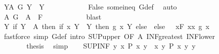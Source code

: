 \begin{isabellebody}
\ {\isachardoublequoteopen}{\isasymforall}Y{\isasymin}A{\isachardot}{\kern0pt}\ G\ Y\ {\isasymin}\ Y{\isachardoublequoteclose}\isanewline
\ \ \ \ \ \ \ \ \ \ \isamarkupfalse%
\ False\ some{\isacharunderscore}{\kern0pt}in{\isacharunderscore}{\kern0pt}eq\ G{\isacharunderscore}{\kern0pt}def\ \isamarkupfalse%
\ auto\isanewline
\ \ \ \ \ \ \ \ \isamarkupfalse%
\ \isamarkupfalse%
\ A{\isacharcolon}{\kern0pt}\ {\isachardoublequoteopen}G\ {\isacharbackquote}{\kern0pt}\ A\ {\isasymin}\ {\isacharquery}{\kern0pt}F{\isachardoublequoteclose}\isanewline
\ \ \ \ \ \ \ \ \ \ \isamarkupfalse%
\ blast\isanewline
\ \ \ \ \ \ \ \ \isamarkupfalse%
\ {\isachardoublequoteopen}{\isacharparenleft}{\kern0pt}{\isasymSqinter}Y{\isachardot}{\kern0pt}\ if\ Y\ {\isasymin}\ A\ then\ if\ x\ Y\ {\isasymin}\ Y\ then\ g\ {\isacharparenleft}{\kern0pt}x\ Y{\isacharparenright}{\kern0pt}\ else\ {\isasymbottom}\ else\ {\isasymtop}{\isacharparenright}{\kern0pt}\ {\isasymle}\ {\isacharparenleft}{\kern0pt}{\isasymSqunion}x{\isasymin}{\isacharquery}{\kern0pt}F{\isachardot}{\kern0pt}\ {\isasymSqinter}x{\isasymin}x{\isachardot}{\kern0pt}\ g\ x{\isacharparenright}{\kern0pt}{\isachardoublequoteclose}\isanewline
\ \ \ \ \ \ \ \ \ \ \isamarkupfalse%
\ {\isacharparenleft}{\kern0pt}fastforce\ simp{\isacharcolon}{\kern0pt}\ G{\isacharunderscore}{\kern0pt}def\ intro{\isacharcolon}{\kern0pt}\ SUP{\isacharunderscore}{\kern0pt}upper{}\ {\isacharbrackleft}{\kern0pt}OF\ A{\isacharbrackright}{\kern0pt}\ INF{\isacharunderscore}{\kern0pt}greatest\ INF{\isacharunderscore}{\kern0pt}lower{}{\isacharparenright}{\kern0pt}\isanewline
\ \ \ \ \ \ \isamarkupfalse%
\isanewline
\ \ \ \ \isamarkupfalse%
\isanewline
\ \ \ \ \isamarkupfalse%
\ \isamarkupfalse%
\ {\isacharquery}{\kern0pt}thesis\ \isamarkupfalse%
\ simp\isanewline
\ \ \isamarkupfalse%
\isanewline
{}\isamarkupfalse%
%
\endisatagproof
{\isafoldproof}%
%
\isadelimproof
\isanewline
%
\endisadelimproof
\isanewline
{}\isamarkupfalse%
\ SUP{\isacharunderscore}{\kern0pt}INF{\isacharcolon}{\kern0pt}\ {\isachardoublequoteopen}{\isacharparenleft}{\kern0pt}{\isasymSqunion}y{\isachardot}{\kern0pt}\ {\isasymSqinter}x{\isachardot}{\kern0pt}\ P\ x\ y{\isacharparenright}{\kern0pt}\ {\isacharequal}{\kern0pt}\ {\isacharparenleft}{\kern0pt}{\isasymSqinter}x{\isachardot}{\kern0pt}\ {\isasymSqunion}y{\isachardot}{\kern0pt}\ P\ {\isacharparenleft}{\kern0pt}x\ y{\isacharparenright}{\kern0pt}\ y{\isacharparenright}{\kern0pt}{\isachardoublequoteclose}\isanewline

\end{isabellebody}
